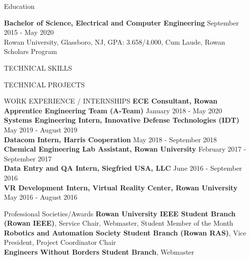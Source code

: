 \documentclass{classes/resume} %
\begin{document}
\begin{rSection}{Education}

  {\bf Bachelor of Science, Electrical and Computer Engineering} \hfill
  {September 2015 - May 2020}
  \\
  Rowan University, Glassboro, NJ,  GPA:  3.658/4.000, Cum Laude, Rowan Scholars Program

\end{rSection}


\begin{rSection}{TECHNICAL SKILLS}

    \skills

\end{rSection}


\begin{rSection}{TECHNICAL PROJECTS}
  \projects

\end{rSection}



\begin{rSection}{WORK EXPERIENCE / INTERNSHIPS} \itemsep -3pt
  \textbf{ECE Consultant, Rowan Apprentice Engineering Team (A-Team)} \hfill January 2018 - May 2020\\
  \textbf{Systems Engineering Intern, Innovative Defense Technologies (IDT)} \hfill May 2019 - August 2019\\
  \textbf{Datacom Intern, Harris Cooperation} \hfill May 2018 - September 2018\\
  \textbf{Chemical Engineering Lab Assistant, Rowan University} \hfill February 2017 - September 2017\\
  \textbf{Data Entry and QA Intern, Siegfried USA, LLC} \hfill June 2016 - September 2016\\
  \textbf{VR Development Intern, Virtual Reality Center, Rowan University} \hfill May 2016 - August 2016
\end{rSection}

\begin{rSection}{Professional Societies/Awards} \itemsep -3pt
  {\textbf{Rowan University IEEE Student Branch (Rowan IEEE)}, Service Chair,
  Webmaster, Student Member of the Month}\\
  {\textbf{Robotics and Automation Society Student Branch (Rowan RAS)}, Vice President, Project Coordinator Chair}\\
  {\textbf{Engineers Without Borders Student Branch}, Webmaster}
\end{rSection}
\end{document}
